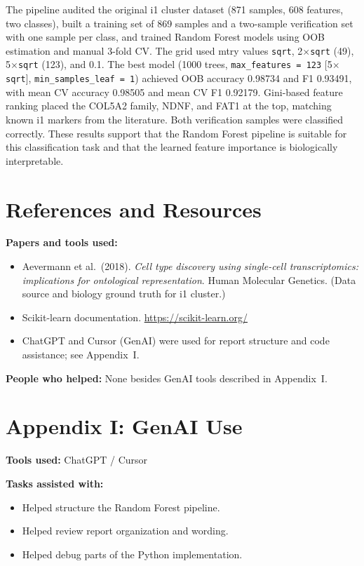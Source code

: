 \documentclass[11pt]{article}
\begin{document}
The pipeline audited the original i1 cluster dataset (871 samples, 608 features, two classes), built a training set of 869 samples and a two-sample verification set with one sample per class, and trained Random Forest models using OOB estimation and manual 3-fold CV. The grid used mtry values \texttt{sqrt}, 2$\times$\texttt{sqrt} (49), 5$\times$\texttt{sqrt} (123), and 0.1. The best model (1000 trees, \texttt{max\_features = 123} [5$\times$\texttt{sqrt}], \texttt{min\_samples\_leaf = 1}) achieved OOB accuracy 0.98734 and F1 0.93491, with mean CV accuracy 0.98505 and mean CV F1 0.92179. Gini-based feature ranking placed the COL5A2 family, NDNF, and FAT1 at the top, matching known i1 markers from the literature. Both verification samples were classified correctly. These results support that the Random Forest pipeline is suitable for this classification task and that the learned feature importance is biologically interpretable.

\section{References and Resources}

\textbf{Papers and tools used:}
\begin{itemize}[leftmargin=1.5em]
    \item Aevermann et al.\ (2018). \textit{Cell type discovery using single-cell transcriptomics: implications for ontological representation}. Human Molecular Genetics. (Data source and biology ground truth for i1 cluster.)
    \item Scikit-learn documentation. \url{https://scikit-learn.org/}
    \item ChatGPT and Cursor (GenAI) were used for report structure and code assistance; see Appendix~I.
\end{itemize}

\textbf{People who helped:} None besides GenAI tools described in Appendix~I.

\appendix

\section{Appendix I: GenAI Use}

\textbf{Tools used:} ChatGPT / Cursor

\textbf{Tasks assisted with:}
\begin{itemize}[leftmargin=1.5em]
    \item Helped structure the Random Forest pipeline.
    \item Helped review report organization and wording.
    \item Helped debug parts of the Python implementation.
\end{itemize}
\end{document}
